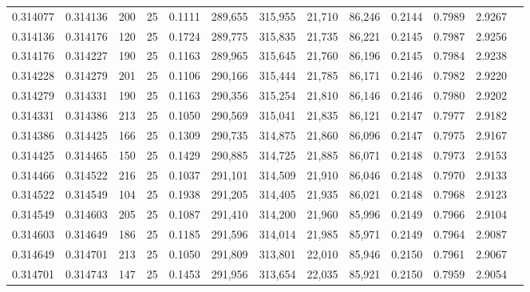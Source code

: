 \begin{tabular}{rrrrrrrrrrrrr}
0.314077 & 0.314136 &   200 &  25 &                                     0.1111 & 289,655 & 315,955 &  21,710 &  86,246 & 0.2144 & 0.7989 & 2.9267 \\
0.314136 & 0.314176 &   120 &  25 &                                     0.1724 & 289,775 & 315,835 &  21,735 &  86,221 & 0.2145 & 0.7987 & 2.9256 \\
0.314176 & 0.314227 &   190 &  25 &                                     0.1163 & 289,965 & 315,645 &  21,760 &  86,196 & 0.2145 & 0.7984 & 2.9238 \\
0.314228 & 0.314279 &   201 &  25 &                                     0.1106 & 290,166 & 315,444 &  21,785 &  86,171 & 0.2146 & 0.7982 & 2.9220 \\
0.314279 & 0.314331 &   190 &  25 &                                     0.1163 & 290,356 & 315,254 &  21,810 &  86,146 & 0.2146 & 0.7980 & 2.9202 \\
0.314331 & 0.314386 &   213 &  25 &                                     0.1050 & 290,569 & 315,041 &  21,835 &  86,121 & 0.2147 & 0.7977 & 2.9182 \\
0.314386 & 0.314425 &   166 &  25 &                                     0.1309 & 290,735 & 314,875 &  21,860 &  86,096 & 0.2147 & 0.7975 & 2.9167 \\
0.314425 & 0.314465 &   150 &  25 &                                     0.1429 & 290,885 & 314,725 &  21,885 &  86,071 & 0.2148 & 0.7973 & 2.9153 \\
0.314466 & 0.314522 &   216 &  25 &                                     0.1037 & 291,101 & 314,509 &  21,910 &  86,046 & 0.2148 & 0.7970 & 2.9133 \\
0.314522 & 0.314549 &   104 &  25 &                                     0.1938 & 291,205 & 314,405 &  21,935 &  86,021 & 0.2148 & 0.7968 & 2.9123 \\
0.314549 & 0.314603 &   205 &  25 &                                     0.1087 & 291,410 & 314,200 &  21,960 &  85,996 & 0.2149 & 0.7966 & 2.9104 \\
0.314603 & 0.314649 &   186 &  25 &                                     0.1185 & 291,596 & 314,014 &  21,985 &  85,971 & 0.2149 & 0.7964 & 2.9087 \\
0.314649 & 0.314701 &   213 &  25 &                                     0.1050 & 291,809 & 313,801 &  22,010 &  85,946 & 0.2150 & 0.7961 & 2.9067 \\
0.314701 & 0.314743 &   147 &  25 &                                     0.1453 & 291,956 & 313,654 &  22,035 &  85,921 & 0.2150 & 0.7959 & 2.9054 \\

\end{tabular}

